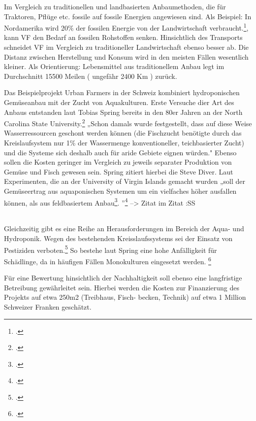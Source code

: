 \documentclass{scrartcl}
\begin{document}
Im Vergleich zu traditionellen und landbasierten Anbaumethoden, die für Traktoren, Pflüge etc. fossile auf fossile Energien angewiesen sind. Als Beispiel: In Nordamerika wird 20\% der fossilen Energie von der Landwirtschaft verbraucht.\footcite[Vgl.][S.27]{Al-Kodmany2018TheCity[82,83]}, kann VF den Bedarf an fossilen Rohstoffen senken.
Hinsichtlich des Transports schneidet VF im Vergleich zu traditioneller Landwirtschaft ebenso besser ab. Die Distanz zwischen Herstellung und Konsum wird in den meisten Fällen wesentlich kleiner. Als Orientierung: Lebensmittel aus traditionellem Anbau legt im Durchschnitt 15500 Meilen ( ungefähr 2400 Km ) zurück.


Das Beispielprojekt Urban Farmers in der Schweiz kombiniert hydroponischen Gemüseanbau mit der Zucht von Aquakulturen. Erste Versuche dier Art des Anbaus entstanden laut Tobias Spring bereits in den 80er Jahren an der North Carolina State University.\footcite{Diver2006Aquaponics-IntegrationAquaculture} „Schon damals wurde festgestellt, dass auf diese Weise Wasserressourcen geschont werden können (die Fischzucht benötigte durch das Kreislaufsystem nur 1\% der Wassermenge konventioneller, teichbasierter Zucht) und die Systeme sich deshalb auch für aride Gebiete eignen würden." Ebenso sollen die Kosten geringer im Vergleich zu jeweils separater Produktion von Gemüse und Fisch gewesen sein. Spring zitiert hierbei die Steve Diver. Laut Experimenten, die an der University of Virgin Islands gemacht wurden „soll der Gemüseertrag aus aquaponischen Systemen um ein vielfaches höher ausfallen können, als aus feldbasiertem Anbau\footcite{Diver2006Aquaponics-IntegrationAquaculture}. ”\footcite[S.27]{TobiasSpringDerBasel-Stadt} --> Zitat im Zitat :SS

\\
Gleichzeitig gibt es eine Reihe an Herausforderungen im Bereich der Aqua- und Hydroponik.
Wegen des bestehenden Kreisslaufssystems sei der Einsatz von Pestiziden verboten.\footcite[]{FreiMatthiasHartmann2007AquaponikGemuse.}  So bestehe laut Spring eine hohe Anfälligkeit für Schädlinge, da in häufigen Fällen Monokulturen eingesetzt werden. \footcite[S.27]{TobiasSpringDerBasel-Stadt}

Für eine Bewertung hinsichtlich der Nachhaltigkeit soll ebenso eine langfristige Betreibung gewährleitet sein. Hierbei werden die Kosten zur Finanzierung des Projekts auf etwa 250m2 (Treibhaus, Fisch- becken, Technik) auf etwa 1 Million Schweizer Franken geschätzt.
\end{document}
